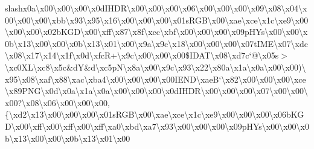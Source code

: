 slash{}x0a\textbackslash{}x00\textbackslash{}x00\textbackslash{}x00\textbackslash{}x0d\+I\+H\+D\+R\textbackslash{}x00\textbackslash{}x00\textbackslash{}x00\textbackslash{}x06\textbackslash{}x00\textbackslash{}x00\textbackslash{}x00\textbackslash{}x09\textbackslash{}x08\textbackslash{}x04\textbackslash{}x00\textbackslash{}x00\textbackslash{}x00\textbackslash{}xbb\textbackslash{}x93\textbackslash{}x95\textbackslash{}x16\textbackslash{}x00\textbackslash{}x00\textbackslash{}x00\textbackslash{}x01s\+R\+G\+B\textbackslash{}x00\textbackslash{}xae\textbackslash{}xce\textbackslash{}x1c\textbackslash{}xe9\textbackslash{}x00\textbackslash{}x00\textbackslash{}x00\textbackslash{}x02b\+K\+G\+D\textbackslash{}x00\textbackslash{}xff\textbackslash{}x87\textbackslash{}x8f\textbackslash{}xcc\textbackslash{}xbf\textbackslash{}x00\textbackslash{}x00\textbackslash{}x00\textbackslash{}x09p\+H\+Ys\textbackslash{}x00\textbackslash{}x00\textbackslash{}x0b\textbackslash{}x13\textbackslash{}x00\textbackslash{}x00\textbackslash{}x0b\textbackslash{}x13\textbackslash{}x01\textbackslash{}x00\textbackslash{}x9a\textbackslash{}x9c\textbackslash{}x18\textbackslash{}x00\textbackslash{}x00\textbackslash{}x00\textbackslash{}x07t\+I\+M\+E\textbackslash{}x07\textbackslash{}xdc\textbackslash{}x08\textbackslash{}x17\textbackslash{}x14\textbackslash{}x1f\textbackslash{}x0d\textbackslash{}xfc\+R+\textbackslash{}x9c\textbackslash{}x00\textbackslash{}x00\textbackslash{}x00\$\+I\+D\+A\+T\textbackslash{}x08\textbackslash{}xd7c`@\textbackslash{}x05s$>$\textbackslash{}xc0\+X\+L\textbackslash{}xc8\textbackslash{}x5c\&d\+Y\&d\textbackslash{}xc5p\+N\textbackslash{}x8a\textbackslash{}x00\textbackslash{}x9c\textbackslash{}x93\textbackslash{}x22\textbackslash{}x80a\textbackslash{}x1a\textbackslash{}x0a\textbackslash{}x00\textbackslash{}x00)\textbackslash{}x95\textbackslash{}x08\textbackslash{}xaf\textbackslash{}x88\textbackslash{}xac\textbackslash{}xba4\textbackslash{}x00\textbackslash{}x00\textbackslash{}x00\textbackslash{}x00\+I\+E\+N\+D\textbackslash{}xae\+B`\textbackslash{}x82\textbackslash{}x00\textbackslash{}x00\textbackslash{}x00\textbackslash{}xce\textbackslash{}x89\+P\+N\+G\textbackslash{}x0d\textbackslash{}x0a\textbackslash{}x1a\textbackslash{}x0a\textbackslash{}x00\textbackslash{}x00\textbackslash{}x00\textbackslash{}x0d\+I\+H\+D\+R\textbackslash{}x00\textbackslash{}x00\textbackslash{}x00\textbackslash{}x07\textbackslash{}x00\textbackslash{}x00\textbackslash{}x00?\textbackslash{}x08\textbackslash{}x06\textbackslash{}x00\textbackslash{}x00\textbackslash{}x00,\{\textbackslash{}xd2\textbackslash{}x13\textbackslash{}x00\textbackslash{}x00\textbackslash{}x00\textbackslash{}x01s\+R\+G\+B\textbackslash{}x00\textbackslash{}xae\textbackslash{}xce\textbackslash{}x1c\textbackslash{}xe9\textbackslash{}x00\textbackslash{}x00\textbackslash{}x00\textbackslash{}x06b\+K\+G\+D\textbackslash{}x00\textbackslash{}xff\textbackslash{}x00\textbackslash{}xff\textbackslash{}x00\textbackslash{}xff\textbackslash{}xa0\textbackslash{}xbd\textbackslash{}xa7\textbackslash{}x93\textbackslash{}x00\textbackslash{}x00\textbackslash{}x00\textbackslash{}x09p\+H\+Ys\textbackslash{}x00\textbackslash{}x00\textbackslash{}x0b\textbackslash{}x13\textbackslash{}x00\textbackslash{}x00\textbackslash{}x0b\textbackslash{}x13\textbackslash{}x01\textbackslash{}x00\textb